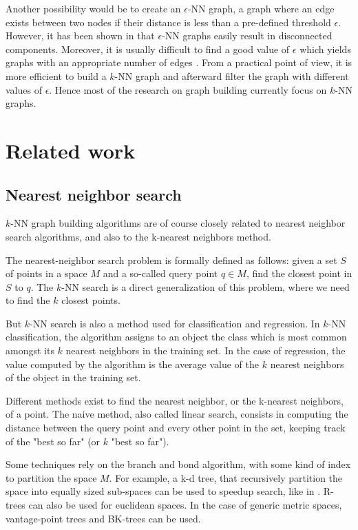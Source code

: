 \documentclass[wcp]{jmlr}
\begin{document}
Another possibility would be to create an $\epsilon$-NN graph, a graph where an edge exists between two nodes if their distance is less than a pre-defined threshold $\epsilon$. However, it has been shown in \cite{Belkin:2003:LED:795523.795528} that $\epsilon$-NN graphs easily result in disconnected components. Moreover, it is usually difficult to find a good value of $\epsilon$ which yields graphs with an appropriate number of edges \cite{Chen2009}. From a practical point of view, it is more efficient to build a $k$-NN graph and afterward filter the graph with different values of $\epsilon$. Hence most of the research on graph building currently focus on $k$-NN graphs.

\section{Related work}

\subsection{Nearest neighbor search}
$k$-NN graph building algorithms are of course closely related to nearest neighbor search algorithms, and also to the k-nearest neighbors method.

The nearest-neighbor search problem is formally defined as follows: given a set $S$ of points in a space $M$ and a so-called query point $q \in M$, find the closest point in $S$ to $q$. The $k$-NN search is a direct generalization of this problem, where we need to find the $k$ closest points.

But $k$-NN search is also a method used for classification and regression. In $k$-NN classification, the algorithm assigns to an object the class which is most common amongst its $k$ nearest neighbors in the training set. In the case of regression, the value computed by the algorithm is the average value of the $k$ nearest neighbors of the object in the training set.

Different methods exist to find the nearest neighbor, or the k-nearest neighbors, of a point. The naive method, also called linear search, consists in computing the distance between the query point and every other point in the set, keeping track of the "best so far" (or $k$ "best so far").

Some techniques rely on the branch and bond algorithm, with some kind of index to partition the space $M$. For example, a k-d tree, that recursively partition the space into equally sized sub-spaces can be used to speedup search, like in \cite{Moore1991}. R-trees can also be used for euclidean spaces. In the case of generic metric spaces, vantage-point trees and BK-trees can be used.
\end{document}
